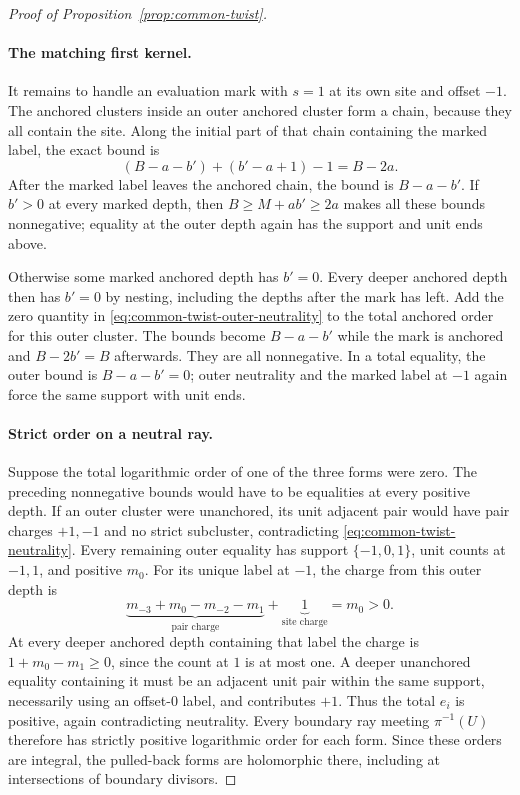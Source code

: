 \begin{proof}[Proof of Proposition~\ref{prop:common-twist}]
\paragraph{The matching first kernel.}
It remains to handle an evaluation mark with $s=1$ at its own site
and offset $-1$. The anchored clusters inside an outer anchored
cluster form a chain, because they all contain the site. Along the
initial part of that chain containing the marked label, the exact
bound is
\[
 (B-a-b')+(b'-a+1)-1=B-2a.
\]
After the marked label leaves the anchored chain, the bound is
$B-a-b'$. If $b'>0$ at every marked depth, then
$B\ge M+ab'\ge2a$ makes all these bounds nonnegative; equality
at the outer depth again has the support and unit ends above.

Otherwise some marked anchored depth has $b'=0$. Every deeper
anchored depth then has $b'=0$ by nesting, including the depths
after the mark has left. Add the zero quantity in
\eqref{eq:common-twist-outer-neutrality} to the total anchored
order for this outer cluster. The bounds become $B-a-b'$ while
the mark is anchored and $B-2b'=B$ afterwards. They are all
nonnegative. In a total equality, the outer bound is $B-a-b'=0$;
outer neutrality and the marked label at $-1$ again force the
same support with unit ends.

\paragraph{Strict order on a neutral ray.}
Suppose the total logarithmic order of one of the three forms were
zero. The preceding nonnegative bounds would have to be equalities
at every positive depth. If an outer cluster were unanchored, its
unit adjacent pair would have pair charges $+1,-1$ and no strict
subcluster, contradicting \eqref{eq:common-twist-neutrality}.
Every remaining outer equality has support $\{-1,0,1\}$, unit
counts at $-1,1$, and positive $m_0$. For its unique label at
$-1$, the charge from this outer depth is
\[
 \underbrace{m_{-3}+m_0-m_{-2}-m_1}_{\text{pair charge}}
 +\underbrace{1}_{\text{site charge}}=m_0>0.
\]
At every deeper anchored depth containing that label the charge is
$1+m_0-m_1\ge0$, since the count at $1$ is at most one. A deeper
unanchored equality containing it must be an adjacent unit pair
within the same support, necessarily using an offset-$0$ label,
and contributes $+1$. Thus the total $e_i$ is positive, again
contradicting neutrality. Every boundary ray meeting $\pi^{-1}(U)$
therefore has strictly positive logarithmic order for each form.
Since these orders are integral, the pulled-back forms are
holomorphic there, including at intersections of boundary divisors.


\end{proof}
